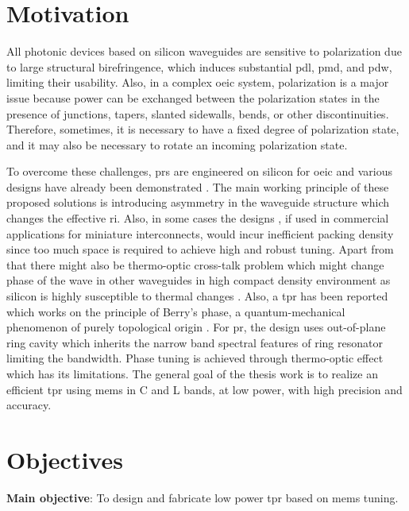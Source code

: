 \documentclass[../report.tex]{subfiles}
\begin{document}
	\section{Motivation} 
All photonic devices based on silicon waveguides are sensitive to polarization due to large structural birefringence, which induces substantial \gls{pdl}, \gls{pmd}, and \gls{pdw}, limiting their usability. Also, in a complex \gls{oeic} system, polarization is a major issue because power can be exchanged between the polarization states in the presence of junctions, tapers, slanted sidewalls, bends, or other discontinuities. Therefore, sometimes, it is necessary to have a fixed degree of polarization state, and it may also be necessary to rotate an incoming polarization state.\par
To overcome these challenges, \gls{pr}s are engineered on silicon for \gls{oeic} and various designs have already been demonstrated \cite{xie_efficient_2015,velasco_ultracompact_2012,leung_numerical_2011,wang_design_2014,dai_novel_2011,wirth_efficient_2012,chen_compact_2011}. The main working principle of these proposed solutions is introducing asymmetry in the waveguide structure which changes the effective \gls{ri}. Also, in some cases the designs \cite{sarmiento-merenguel_demonstration_2015}, if used in commercial applications for miniature interconnects, would incur inefficient packing density since too much space is required to achieve high and robust tuning. Apart from that there might also be thermo-optic cross-talk problem which might change phase of the wave in other waveguides in high compact density environment as silicon is highly susceptible to thermal changes \cite{ibrahim_athermal_2012}. Also, a \gls{tpr} has been reported which works on the principle of Berry’s phase, a quantum-mechanical phenomenon of purely topological origin \cite{xu_electrically_2014}. For \gls{pr}, the design uses out-of-plane ring cavity which inherits the narrow band spectral features of ring resonator limiting the bandwidth. Phase tuning is achieved through thermo-optic effect which has its limitations. The general goal of the thesis work is to realize an efficient \gls{tpr} using \gls{mems} in C and L bands, at low power, with high precision and accuracy.    
	\section{Objectives}
\textbf{Main objective}: To design and fabricate low power \gls{tpr} based on \gls{mems} tuning. \\
\end{document}
